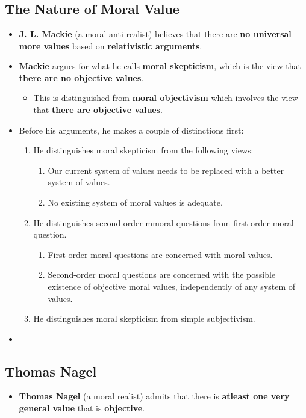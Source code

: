 \documentclass[16pt]{article}
\begin{document}
    \section*{}

    \subsection*{The Nature of Moral Value}
    \begin{itemize}
        \item \textbf{J. L. Mackie} (a moral anti-realist) believes that there are \textbf{no universal more values} based on \textbf{relativistic arguments}.
        \item \textbf{Mackie} argues for what he calls \textbf{moral skepticism}, which is the view that \textbf{there are no objective values}.
        \begin{itemize}
            \item This is distinguished from \textbf{moral objectivism} which involves  the view that \textbf{there are objective values}.
        \end{itemize}
        \item Before his arguments, he makes a couple of distinctions first:
        \begin{enumerate}
            \item He distinguishes moral skepticism from the following views:
            \begin{enumerate}
                \item Our current system of values needs to be replaced with a better system of values.
                \item No existing system of moral values is adequate.
            \end{enumerate}
            \item He distinguishes second-order mmoral questions from first-order moral question.
            \begin{enumerate}
                \item First-order moral questions are concerned with moral values.
                \item Second-order moral questions are concerned with the possible existence of objective moral values, independently of any system of values.
            \end{enumerate}
            \item He distinguishes moral skepticism from simple subjectivism.
        \end{enumerate}
        \item 
    \end{itemize}

    \subsection*{Thomas Nagel}
    \begin{itemize}
        \item \textbf{Thomas Nagel} (a moral realist) admits that there is \textbf{atleast one very general value} that is \textbf{objective}.
    \end{itemize}
\end{document}
